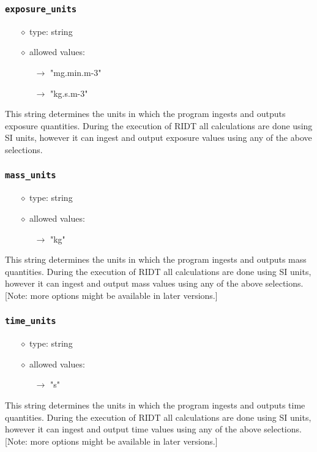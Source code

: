 \documentclass[]{article}
\def\code#1{\texttt{#1}}
\begin{document}
\subsubsection{\code{exposure\_units}}\label{sec:exposureunits}
\begin{itemize}
    \item[$\diamond$] type: string 
    \item[$\diamond$] allowed values:
    \begin{itemize}
        \item[$\rightarrow$] "mg.min.m-3"
        \item[$\rightarrow$] "kg.s.m-3"
    \end{itemize}
\end{itemize}
This string determines the units in which the program ingests and outputs
exposure quantities. During the execution of RIDT all calculations are done
using SI units, however it can ingest and output exposure values using any
of the above selections.

\subsubsection{\code{mass\_units}}\label{sec:massunits}
\begin{itemize}
    \item[$\diamond$] type: string 
    \item[$\diamond$] allowed values:
    \begin{itemize}
        \item[$\rightarrow$] "kg"
    \end{itemize}
\end{itemize}
This string determines the units in which the program ingests and outputs mass
quantities. During the execution of RIDT all calculations are done using SI
units, however it can ingest and output mass values using any of the above
selections. [Note: more options might be available in later versions.]

\subsubsection{\code{time\_units}}\label{sec:timeunits}
\begin{itemize}
    \item[$\diamond$] type: string 
    \item[$\diamond$] allowed values:
    \begin{itemize}
        \item[$\rightarrow$] "s"
    \end{itemize}
\end{itemize}
This string determines the units in which the program ingests and outputs time
quantities. During the execution of RIDT all calculations are done using SI
units, however it can ingest and output time values using any of the above
selections. [Note: more options might be available in later versions.]
\end{document}
